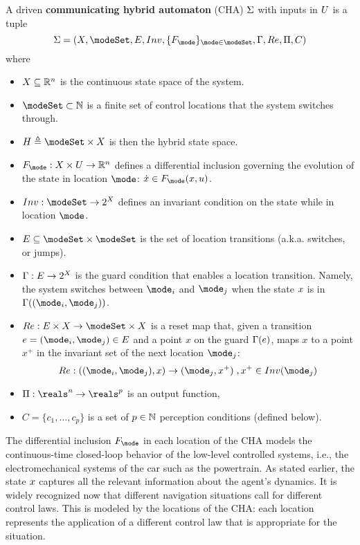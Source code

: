\begin{defn}
	\label{def:CHA}
A driven \textbf{communicating hybrid automaton} (CHA) $\Sigma$ with inputs in $U$ 
is a tuple 
\[\Sys = (\stSet, \modeSet, E, Inv, \{F_\mode\}_{\mode \in \modeSet}, \guard, \reset, \funcOut, C)\]
where 
\begin{itemize}
	\item $X \subseteq \mathbb{R}^n$ is the continuous state space of the system.
	\item $\modeSet \subset \Ne$ is a finite set of control locations that the system switches through. 
	\item $\hsSet \triangleq \modeSet \times \stSet$ is then the hybrid state space.
	\item $F_\mode : \stSet \times \inpSet \rightarrow \Re^n$ defines a differential inclusion governing the evolution of the state in location $\mode$: $\dot{\stPt} \in F_\mode(\stPt,u)$. 
	\item $Inv : \modeSet \rightarrow 2^\stSet$ defines an invariant condition on the state while in location $\mode$.
	\item $E \subseteq \modeSet \times \modeSet$ is the set of location transitions (a.k.a. switches, or jumps).
	\item $\Gamma : E \rightarrow 2^X$ is the guard condition that enables a location transition. 
	Namely, the system switches between $\mode _i$ and $\mode _j$ when the state $x$ is in $\guard((\mode_i,\mode _j))$.
	\item $\reset : E \times \stSet \rightarrow \modeSet \times \stSet $ is a reset map that, given a transition $e = (\mode _i,\mode _j) \in E$ and a point $x$ on the guard $\Gamma(e)$, maps $x$ to a point $x^+$ in the invariant set of the next location $\mode_j$:
	\[\reset: ((\mode _i,\mode _j),x) \rightarrow (\mode_j,x^+)\;, x^+ \in Inv(\mode_j)\] 
	\item $\funcOut: \reals^n \rightarrow \reals^p$ is an output function,
	\item $C = \{c_1,\ldots,c_p\}$ is a set of $p \in \mathbb{N}$ perception conditions (defined below).	
\end{itemize}
\end{defn}

The differential inclusion $F_\mode$ in each location of the CHA models the continuous-time closed-loop behavior of the low-level controlled systems, i.e., the electromechanical systems of the car such as the powertrain.
As stated earlier, the state $x$ captures all the relevant information about the agent's dynamics. 
It is widely recognized now that different navigation situations call for different control laws.
This is modeled by the locations of the CHA: each location represents the application of a different control law that is appropriate for the situation.


